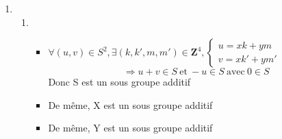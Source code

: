 \documentclass[11pt,a4paper,fleqn]{article}
\begin{document}
\begin{enumerate}
\begin{enumerate}
				D\'emontrons par l'absurde que G admet un plus petit \'el\'ement
				\newline
				
				Supposons que $G \cap \mathbf{R^*_+}$ n'admet pas de plus petit \'el\'ement.\\				
				Comme	$G \cap \mathbf{R^*_+}$ est minor\'e par $0$,	$G \cap \mathbf{R^*_+}$	admet une borne inf\`erieure qui ne sera pas un minimum.
				
					
			  \[\Rightarrow \forall \epsilon > 0, ~\exists (x,y) \in (G \cap \mathbf{R^*_+})^2,
					~ inf(G \cap \mathbf{R^*_+}) < x < y < inf(G \cap \mathbf{R^*_+}) + \epsilon \]
				
				pour $\epsilon = inf(G \cap \mathbf{R^*_+})$, comme $y - x \in G$ on a
				
				\[\exists (x,y) \in (G \cap \mathbf{R^*_+})^2, 0 < y - x < inf(G \cap \mathbf{R^*_+})
					\quad \textrm{ce qui est absurde!!} \]
				
				Donc $G \cap \mathbf{R^*_+}$ admet un plus petit \'el\'ement\\
				
								
			\item
				
				\begin{itemize}
					\item
						$G \subset m \mathbf{Z}$ (car $m \in G$ et $G$ est un sous-groupe additif)
					
					\item
						$m \mathbf{Z} \not\subset G$
						\[\Rightarrow \exists x \in G, x \notin m \mathbf{Z}\]
						\[\Rightarrow \exists x \in G, x - m \left \lfloor{x \over m}\right \rfloor \in \rbrack 0, m \lbrack
							\quad \textrm{ce qui est absurde car} ~ m = min(G \cap \mathbf{R^+_*})\]
				\end{itemize}
				
				Donc $G = m \mathbf{Z}$
			
			\end{enumerate}
		
		\item
		
			\begin{enumerate}
				
				\item
					
					\begin{itemize}
						\item
							$\forall (u, v) \in S^2, \exists (k, k', m, m') \in \mathbf{Z}^4,
								\left\lbrace
									\begin{array}{c} u = x k + y m \\ v = x k' + y m' \end{array}
								\right.$
							\[\Rightarrow u + v \in S ~\textrm{et}~ -u \in S ~\textrm{avec} ~ 0 \in S\]
							Donc S est un sous groupe additif						
						\item
							De m\^eme, X est un sous groupe additif
							\newline
						\item
							De m\^eme, Y est un sous groupe additif
							\newline


\end{itemize}
\end{enumerate}
\end{enumerate}
\end{document}
